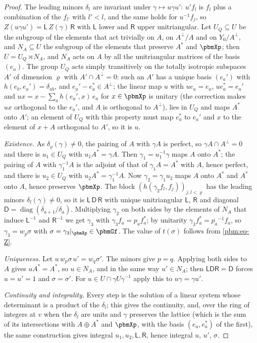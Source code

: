 \documentclass[10pt]{amsart}
\theoremstyle{definition}
\theoremstyle{remark}
\providecommand{\aubar}[1]{\overline{#1}}
\begin{document}
\begin{proof}
The leading minors $\delta_l$ are invariant under $\gamma\mapsto u\gamma u'$: $u'f_l$ is $f_l$ plus
a combination of the $f_{l'}$ with $l'<l$, and the same holds for $u^{-1}f_j$, so $Z(u\gamma u')=
\mathsf L\,Z(\gamma)\,\mathsf R$ with $\mathsf L$ lower and $\mathsf R$ upper unitriangular. Let
$U_Q\subseteq U$ be the subgroup of the elements that act trivially on $A$, on $A^\perp/A$ and on
$Y_0/A^\perp$, and $N_A\subseteq U$ the subgroup of the elements that preserve $A^*$ and $\pbmXp$;
then $U=U_Q\rtimes N_A$, and $N_A$ acts on $A$ by all the unitriangular matrices of the basis
$(e_a)$. The group $U_Q$ acts simply transitively on the totally isotropic subspaces $A'$ of
dimension $\varrho$ with $A'\cap A^\perp=0$: such an $A'$ has a unique basis $(e_a')$ with $h(e_b,
e_a')=\delta_{ab}$, and $e_a'-e_a^*\in A^\perp$; the linear map $u$ with $ue_a=e_a$, $ue_a^*=e_a'$
and $ux=x-\sum_a\aubar{h(e_a',x)}\,e_a$ for $x\in\pbmXp$ is unitary (the correction makes $ux$
orthogonal to the $e_a'$, and $A$ is orthogonal to $A^\perp$), lies in $U_Q$ and maps $A^*$ onto
$A'$; an element of $U_Q$ with this property must map $e_a^*$ to $e_a'$ and $x$ to the element of
$x+A$ orthogonal to $A'$, so it is $u$.

\emph{Existence.} As $\delta_\varrho(\gamma)\ne0$, the pairing of $A$ with $\gamma A$ is perfect, so
$\gamma A\cap A^\perp=0$ and there is $u_1\in U_Q$ with $u_1A^*=\gamma A$. Then $\gamma_1=u_1^{-1}
\gamma$ maps $A$ onto $A^*$; the pairing of $A$ with $\gamma_1^{-1}A$ is the adjoint of that of
$\gamma_1A=A^*$ with $A$, hence perfect, and there is $u_2\in U_Q$ with $u_2A^*=\gamma_1^{-1}A$. Now
$\gamma_2=\gamma_1u_2$ maps $A$ onto $A^*$ and $A^*$ onto $A$, hence preserves $\pbmXp$. The block
$(h(\gamma_2f_l,f_j))_{j,l<\varrho}$ has the leading minors $\delta_l(\gamma)\ne0$, so it is
$\mathsf L\,\mathsf D\,\mathsf R$ with unique unitriangular $\mathsf L$, $\mathsf R$ and diagonal
$\mathsf D=\operatorname{diag}(\delta_{a+1}/\delta_a)$. Multiplying $\gamma_2$ on both sides by the
elements of $N_A$ that induce $\mathsf L^{-1}$ and $\mathsf R^{-1}$ we get $\gamma_3$ with $\gamma_3
f_a=p_af_a^*$; by unitarity $\gamma_3f_a^*=\aubar{p_a}^{-1}f_a$, so $\gamma_3=w_p\sigma$ with
$\sigma=\gamma_3|_{\pbmXp}\in\pbmGf$. The value of $t(\sigma)$ follows from \eqref{pbm:eq-Z}.

\emph{Uniqueness.} Let $u\,w_p\sigma\,u'=w_q\sigma'$. The minors give $p=q$. Applying both sides to
$A$ gives $uA^*=A^*$, so $u\in N_A$, and in the same way $u'\in N_A$; then $\mathsf L\mathsf D\mathsf
R=\mathsf D$ forces $u=u'=1$ and $\sigma=\sigma'$. For $u\in U\cap\gamma U\gamma^{-1}$ apply this to
$u\gamma=\gamma u'$.

\emph{Continuity and integrality.} Every step is the solution of a linear system whose determinant
is a product of the $\delta_l$; this gives the continuity, and, over the ring of integers at $v$
when the $\delta_l$ are units and $\gamma$ preserves the lattice (which is the sum of its
intersections with $A\oplus A^*$ and $\pbmXp$, with the basis $(e_a,e_a^*)$ of the first), the same
construction gives integral $u_1,u_2,\mathsf L,\mathsf R$, hence integral $u$, $u'$, $\sigma$.
\end{proof}
\end{document}
